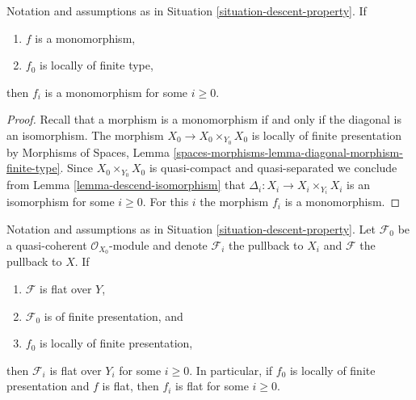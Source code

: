 \begin{lemma}
\label{lemma-descend-monomorphism}
Notation and assumptions as in Situation \ref{situation-descent-property}. If
\begin{enumerate}
\item $f$ is a monomorphism,
\item $f_0$ is locally of finite type,
\end{enumerate}
then $f_i$ is a monomorphism for some $i \geq 0$.
\end{lemma}

\begin{proof}
Recall that a morphism is a monomorphism if and only if the diagonal is
an isomorphism. The morphism $X_0 \to X_0 \times_{Y_0} X_0$ is locally of
finite presentation by
Morphisms of Spaces, Lemma
\ref{spaces-morphisms-lemma-diagonal-morphism-finite-type}.
Since $X_0 \times_{Y_0} X_0$ is quasi-compact and quasi-separated
we conclude from
Lemma \ref{lemma-descend-isomorphism}
that $\Delta_i : X_i \to X_i \times_{Y_i} X_i$ is an isomorphism for
some $i \geq 0$. For this $i$ the morphism $f_i$ is a monomorphism.
\end{proof}

\begin{lemma}
\label{lemma-descend-flat}
Notation and assumptions as in Situation \ref{situation-descent-property}.
Let $\mathcal{F}_0$ be a quasi-coherent $\mathcal{O}_{X_0}$-module
and denote $\mathcal{F}_i$ the pullback to $X_i$ and $\mathcal{F}$
the pullback to $X$. If
\begin{enumerate}
\item $\mathcal{F}$ is flat over $Y$,
\item $\mathcal{F}_0$ is of finite presentation, and
\item $f_0$ is locally of finite presentation,
\end{enumerate}
then $\mathcal{F}_i$ is flat over $Y_i$ for some $i \geq 0$.
In particular, if $f_0$ is locally of finite presentation and
$f$ is flat, then $f_i$ is flat for some $i \geq 0$.
\end{lemma}

